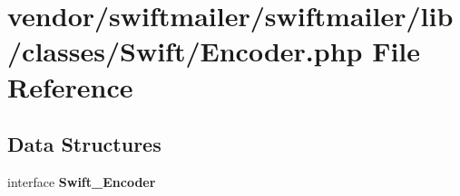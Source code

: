 \section{vendor/swiftmailer/swiftmailer/lib/classes/\+Swift/\+Encoder.php File Reference}
\label{_encoder_8php}
\subsection*{Data Structures}
\begin{DoxyCompactItemize}
\item 
interface {\bf Swift\+\_\+\+Encoder}
\end{DoxyCompactItemize}
